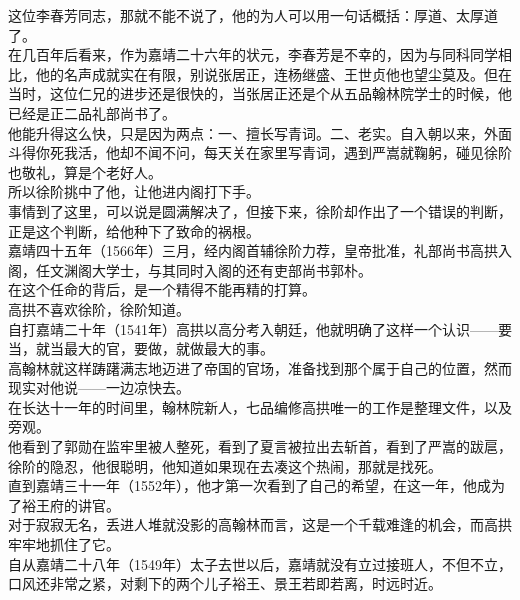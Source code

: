 \begin{multicols}{\theparacolNo}
这位李春芳同志，那就不能不说了，他的为人可以用一句话概括：厚道、太厚道了。\\

在几百年后看来，作为嘉靖二十六年的状元，李春芳是不幸的，因为与同科同学相比，他的名声成就实在有限，别说张居正，连杨继盛、王世贞他也望尘莫及。但在当时，这位仁兄的进步还是很快的，当张居正还是个从五品翰林院学士的时候，他已经是正二品礼部尚书了。\\

他能升得这么快，只是因为两点：一、擅长写青词。二、老实。自入朝以来，外面斗得你死我活，他却不闻不问，每天关在家里写青词，遇到严嵩就鞠躬，碰见徐阶也敬礼，算是个老好人。\\

所以徐阶挑中了他，让他进内阁打下手。\\

事情到了这里，可以说是圆满解决了，但接下来，徐阶却作出了一个错误的判断，正是这个判断，给他种下了致命的祸根。\\

嘉靖四十五年（1566年）三月，经内阁首辅徐阶力荐，皇帝批准，礼部尚书高拱入阁，任文渊阁大学士，与其同时入阁的还有吏部尚书郭朴。\\

在这个任命的背后，是一个精得不能再精的打算。\\

高拱不喜欢徐阶，徐阶知道。\\

自打嘉靖二十年（1541年）高拱以高分考入朝廷，他就明确了这样一个认识——要当，就当最大的官，要做，就做最大的事。\\

高翰林就这样踌躇满志地迈进了帝国的官场，准备找到那个属于自己的位置，然而现实对他说——一边凉快去。\\

在长达十一年的时间里，翰林院新人，七品编修高拱唯一的工作是整理文件，以及旁观。\\

他看到了郭勋在监牢里被人整死，看到了夏言被拉出去斩首，看到了严嵩的跋扈，徐阶的隐忍，他很聪明，他知道如果现在去凑这个热闹，那就是找死。\\

直到嘉靖三十一年（1552年），他才第一次看到了自己的希望，在这一年，他成为了裕王府的讲官。\\

对于寂寂无名，丢进人堆就没影的高翰林而言，这是一个千载难逢的机会，而高拱牢牢地抓住了它。\\

自从嘉靖二十八年（1549年）太子去世以后，嘉靖就没有立过接班人，不但不立，口风还非常之紧，对剩下的两个儿子裕王、景王若即若离，时远时近。\\


\end{multicols}
